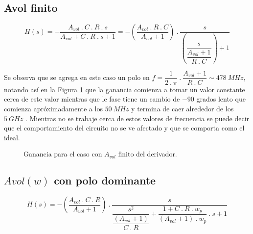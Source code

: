 \documentclass[11pt, a4paper]{article}
\begin{document}
\subsection{Avol finito}
\begin{equation}
H(s) = - \dfrac{A_{vol} \ . \ C \ . \ R \ . \ s}{A_{vol} + C \ . \ R \ . \ s +1 } 
= -
\left( \dfrac{A_{vol} \ . \ R \ . \ C}{A_{vol} + 1} \right) \ . \ \dfrac{s}{ \left( \dfrac{s}{\dfrac {A_{vol} +1}{R \ . \ C}} \right) + 1}
\end{equation}

Se observa que se agrega en este caso un polo en $f = \dfrac{1}{2 \ . \ \pi} \ . \ \dfrac {A_{vol} +1}{R \ . \ C} \sim 478 \ MHz $, notando así en la Figura \ref{avolfinitoderivador} que la ganancia comienza a tomar un valor constante  cerca de este valor mientras que le fase tiene un cambio de $-90$ grados lento que comienza apróximadamente a los $50 \ MHz$ y termina de caer alrededor de los $5 \ GHz$
. Mientras no se trabaje cerca de estos valores de frecuencia se puede decir que el comportamiento del circuito no se ve afectado y que se comporta como el ideal. 

\begin{figure}[h!]
	\begin{center}
		\label{avolfinitoderivador}
		\caption{Ganancia para el caso con $A_{vol}$ finito del derivador.}
	\end{center}
\end{figure}

\subsection{$A{vol}(w)$ con polo dominante}

\begin{equation}
H(s) = - \left( \dfrac{A_{vol} \ . \ C \ . \ R}{A_{vol} + 1} \right) \ . \ \dfrac{s}{ \dfrac{s^2}{\dfrac{(A_{vol}+1)}{C \ . \ R}} + \dfrac{1+ C \ . \ R \ . \ w_p}{(A_{vol} + 1) \ . \ w_p} \ . \ s + 1} 
\end{equation}
\end{document}
